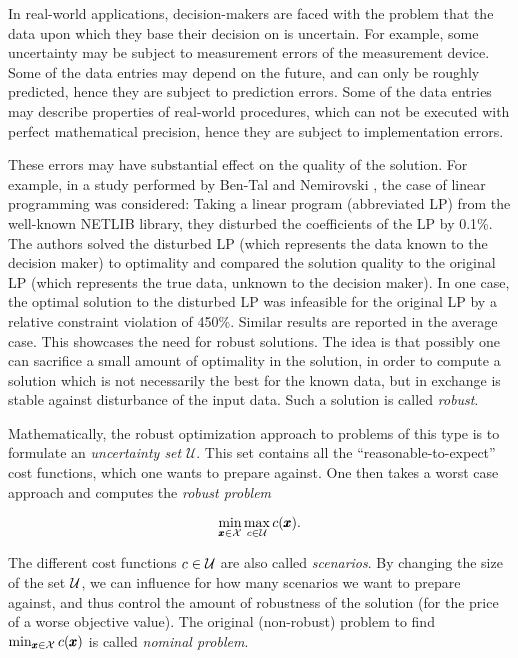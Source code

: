 In real-world applications, decision-makers are faced with the problem that the data upon which they base their decision on is uncertain. For example, some uncertainty may be subject to measurement errors of the measurement device. Some of the data entries may depend on the future, and can only be roughly predicted, hence they are subject to prediction errors. Some of the data entries may describe properties of real-world procedures, which can not be executed with perfect mathematical precision, hence they are subject to implementation errors.

These errors may have substantial effect on the quality of the solution. For example, in a study performed by Ben-Tal and Nemirovski \cite{ben2000robust}, the case of linear programming was considered: 
Taking a linear program (abbreviated LP) from the well-known NETLIB library, they disturbed the coefficients of the LP by 0.1\%. 
The authors solved the disturbed LP (which represents the data known to the decision maker) to optimality and compared the solution quality to the original LP (which represents the true data, unknown to the decision maker). 
In one case, the optimal solution to the disturbed LP was infeasible for the original LP by a relative constraint violation of 450\%. 
Similar results are reported in the average case. This showcases the need for robust solutions. The idea is that possibly one can sacrifice a small amount of optimality in the solution, in order to compute a solution which is not necessarily the best for the known data, but in exchange is stable against disturbance of the input data. Such a solution is called \emph{robust}.



Mathematically, the robust optimization approach to problems of this type is to formulate an \textit{uncertainty set} $\mathcal{U}$. This set contains all the \enquote{reasonable-to-expect} cost functions, which one wants to prepare against. One then takes a worst case approach and computes the \emph{robust problem}

\[
	\min_{\pmb x \in \mathcal{X}} \max_{c \in \mathcal{U}} c(\pmb x).
\]

The different cost functions $c \in \mathcal{U}$ are also called \emph{scenarios}. By changing the size of the set $\mathcal{U}$, we can influence for how many scenarios we want to prepare against, and thus control the amount of robustness of the solution (for the price of a worse objective value). The original (non-robust) problem to find $\min_{\pmb x \in \mathcal{X}} c(\pmb x)$ is called \emph{nominal problem}.

